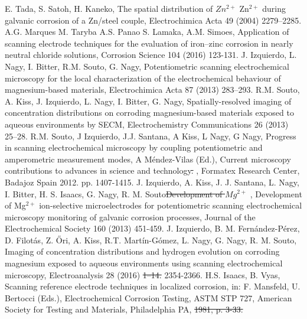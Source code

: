 \documentclass[3p]{elsarticle}
\providecommand{\DIFadd}[1]{{\protect\color{blue}#1}} %
\providecommand{\DIFdel}[1]{{\protect\color{red}\sout{#1}}}                      %
\providecommand{\DIFaddbegin}{} %
\providecommand{\DIFaddend}{} %
\providecommand{\DIFdelbegin}{} %
\providecommand{\DIFdelend}{} %
\begin{document}
\begin{thebibliography}{5}
E. Tada, S. Satoh, H. Kaneko, The spatial distribution of \DIFdelbegin \DIFdel{$Zn^{2+}$ }\DIFdelend \DIFaddbegin \DIFadd{Zn$^{2+}$ }\DIFaddend during galvanic corrosion of a Zn/steel couple, Electrochimica Acta 49 (2004) 2279–2285.
A.G. Marques M. Taryba A.S. Panao S. Lamaka, A.M. Simoes, Application of scanning electrode techniques for the evaluation of iron–zinc corrosion in nearly neutral chloride solutions, Corrosion Science 104 (2016) 123-131.
J. Izquierdo, L. Nagy, I. Bitter, R.M. Souto, G. Nagy, Potentiometric scanning electrochemical microscopy for the local characterization of the electrochemical behaviour of magnesium-based materials, Electrochimica Acta 87 (2013) 283–293.
R.M. Souto, A. Kiss, J. Izquierdo, L. Nagy, I. Bitter, G. Nagy, Spatially-resolved imaging of concentration distributions on corroding magnesium-based materials exposed to aqueous environments by SECM, Electrochemistry Communications 26 (2013) 25–28.
R.M. Souto, J Izquierdo, J.J. Santana, A Kiss, L Nagy, G Nagy\DIFaddbegin \DIFadd{, }\DIFaddend Progress in scanning electrochemical microscopy by coupling potentiometric and amperometric measurement modes\DIFaddbegin \DIFadd{, }\DIFaddend A Méndez-Vilas (Ed.)\DIFaddbegin \DIFadd{, }\DIFaddend Current microscopy contributions to advances in science and technology\DIFdelbegin \DIFdel{. }\DIFdelend \DIFaddbegin \DIFadd{, }\DIFaddend Formatex Research Center, Badajoz Spain 2012. pp. 1407-1415.
J. Izquierdo, A. Kiss, J. J. Santana, L. Nagy, I. Bitter, H. S. Isaacs, G. Nagy, R. M. Souto\DIFdelbegin \DIFdel{Development of $Mg^{2+}$ }\DIFdelend \DIFaddbegin \DIFadd{, Development of Mg$^{2+}$ }\DIFaddend ion-selective microelectrodes for potentiometric scanning electrochemical microscopy monitoring of galvanic corrosion processes\DIFaddbegin \DIFadd{, }\DIFaddend Journal of the Electrochemical Society  160 (2013) 451-459. 
J. Izquierdo, B. M. Fernández-Pérez, D. Filotás, Z. Őri, A. Kiss, R.T. Martín-Gómez, L. Nagy, G. Nagy, R. M. Souto, Imaging of concentration distributions and hydrogen evolution on corroding magnesium exposed to aqueous environments using scanning electrochemical microscopy, Electroanalysis 28 (2016) \DIFdelbegin \DIFdel{1–14.
}\DIFdelend \DIFaddbegin \DIFadd{2354-2366.
}\DIFaddend {}H.S. Isaacs, B. Vyas\DIFaddbegin \DIFadd{, }\DIFaddend Scanning reference electrode techniques in localized corrosion, in: F. Mansfeld, U. Bertocci (Eds.), Electrochemical Corrosion Testing, ASTM STP 727, American Society for Testing and Materials, Philadelphia PA, \DIFdelbegin \DIFdel{1981, p. 3-33.
}
\end{thebibliography}
\end{document}

